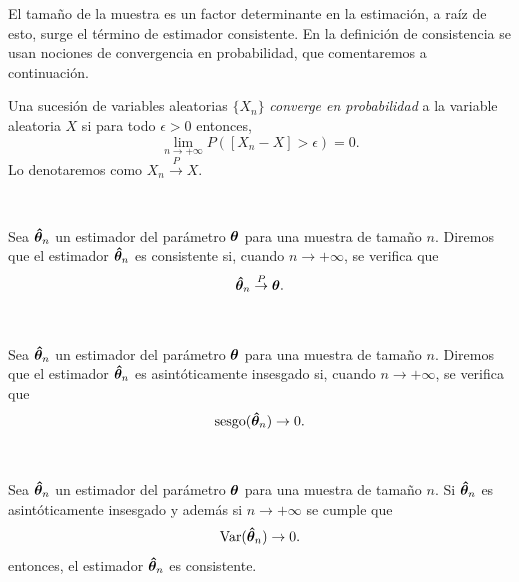 \documentclass[oneside,openright,titlepage,numbers=noenddot,openany,headinclude,footinclude=true,
cleardoublepage=empty,abstractoff,BCOR=5mm,paper=a4,fontsize=12pt,main=spanish]{scrreprt}
\begin{document}
El tamaño de la muestra es un factor determinante en la estimación, a raíz de esto, surge el término de estimador consistente. En la definición de consistencia se usan nociones de convergencia en probabilidad, que comentaremos a continuación.\\

\begin{definition}
Una sucesión de variables aleatorias $\{X_n\}$ \textit{converge en probabilidad} a la variable aleatoria $X$ si para todo $\epsilon>0$ entonces, $$\lim_{n\to +\infty}P([X_n-X]>\epsilon)=0.$$
Lo denotaremos como $X_n \overset{P}{\to} X.$
\end{definition}\

\begin{definition}
Sea $\bm{\hat{\theta}}_n$ un estimador del parámetro $\bm{\theta}$ para una muestra de tamaño $n$. Diremos que el estimador $\bm{\hat{\theta}}_n$ es consistente si, cuando $n\to +\infty$, se verifica que $$\bm{\hat{\theta}}_n \overset{P}{\to} \bm{\theta}.$$
\end{definition}\

\begin{definition}
Sea $\bm{\hat{\theta}}_n$ un estimador del parámetro $\bm{\theta}$ para una muestra de tamaño $n$. Diremos que el estimador $\bm{\hat{\theta}}_n$ es asintóticamente insesgado si, cuando $n\to +\infty$, se verifica que $$\text{sesgo}(\bm{\hat{\theta}}_n) \to 0.$$
\end{definition}\

\begin{corollary} \label{cor:lemaestima}
Sea $\bm{\hat{\theta}}_n$ un estimador del parámetro $\bm{\theta}$ para una muestra de tamaño $n$. Si $\bm{\hat{\theta}}_n$ es asintóticamente insesgado y además si $n\to +\infty$ se cumple que $$\text{Var}(\bm{\hat{\theta}}_n)\to 0.$$
entonces, el estimador $\bm{\hat{\theta}}_n$ es consistente.
\end{corollary}\
\end{document}
